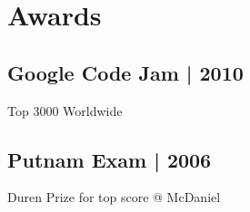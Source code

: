 \documentclass[]{resume}
\begin{document}
\begin{minipage}[t]{0.33\textwidth}
\section{Awards}
\subsection{Google Code Jam | 2010}
Top 3000 Worldwide \\
\sectionsep
\subsection{Putnam Exam | 2006}
Duren Prize for top score @ McDaniel

\sectionsep


%
%

\end{minipage}
\hfill
\end{document}
